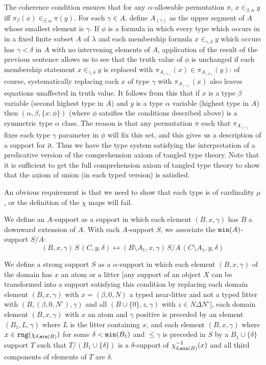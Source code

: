 \documentclass[12pt]{article}
\begin{document}
The coherence condition ensures that for any $\alpha$-allowable permutation $\pi$, $x \in_{\beta,\alpha} y$ iff $\pi_\beta(x) \in_{\beta,\alpha} \pi(y)$.  For each $\gamma \in A$, define $A_{(\gamma)}$ as the upper segment of $A$ whose smallest element is $\gamma$.  If $\phi$ is a formula in which every type which occurs in in a fixed finite subset $A$ of $\lambda$ and each membership formula $x \in_{\gamma,\delta} y$ which occurs has
$\gamma<\delta$ in $A$ with no intervening elements of $A$, application of the result of the previous sentence allows us to see that the truth value of $\phi$ is unchanged if each membership statement $x \in_{\gamma,\delta} y$ is replaced with $\pi_{A_{(\gamma)}}(x) \in \pi_{A_{(\delta)}}(y)$:  of course, systematically replacing each $x$ of type $\gamma$ with
$\pi_{A_{(\gamma)}}(x)$ also leaves equations unaffected in truth value.  It follows from this that if $x$ is a type $\beta$ variable (second highest type in $A$) and $y$ is a type $\alpha$ variable (highest type in $A$) then $(\alpha,\beta,\{x : \phi\})$ (where $\phi$ satsifies the conditions described above) is a symmetric type $\alpha$ class.  The reason is that any
permutation $\pi$ such that $\pi_{A_{(\gamma)}}$ fixes each type $\gamma$ parameter in $\phi$ will fix this set, and this gives us a description of a support for it.  Thus we have the type system satisfying the interpretation of a predicative version of the comprehension axiom of tangled type theory.  Note that it is sufficient to get the full comprehension axiom of
tangled type theory to show that the axiom of union (in each typed version) is satisfied.

An obvious requirement is that we need to show that each type is of cardinality $\mu$, or the definition of the $\chi$ maps will fail.

We define an $A$-support as a support in which each element $(B,x,\gamma)$ has $B$ a downward extension of $A$.  With each $A$-support $S$, we associate the ${\tt min}(A)$-support $S/A$:  $$(B,x,\gamma)\,S\,(C,y,\delta) \leftrightarrow (B\setminus A_1,x,\gamma)\,S/A\,(C\setminus A_1,y,\delta) $$

We define a strong support $S$ as a $\alpha$-support in which each element $(B,x,\gamma)$ of the domain has $x$ an atom or a litter [any support of an object $X$ can be transformed into a support satisfying this condition by replacing each domain
element $(B,x,\gamma)$ with $x=(\beta,0,N)$ a typed near-litter and not a typed litter with $(B,(\beta,0,N^\circ),\gamma)$ and all $(B \cup \{0\},z,\gamma)$ with $z \in N \Delta N^\circ$], each domain element $(B,x,\gamma)$ with $x$ an atom and $\gamma$ positive is preceded
by an element $(B_1,L,\gamma)$ where $L$ is the litter containing $x$, and each element $(B,x,\gamma)$ where $x \in {\tt rng}(\chi_{\delta,{\tt min}(B)})$ for some $\delta<{\tt min}(B_1)$ and $\leq \gamma$ is preceded in $S$ by a $B_1 \cup \{\delta\}$ support $T$ such
that $T/(B_1 \cup \{\delta\})$ is a $\delta$-support of $\chi_{\delta,{\tt min}(B)}^{-1}(x)$ and all third components of elements of $T$ are $\delta$.
\end{document}
